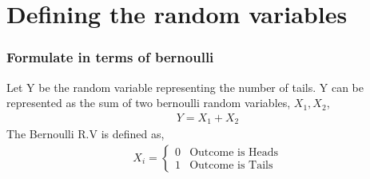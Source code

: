 \documentclass{beamer}
\providecommand{\brak}[1]{\ensuremath{\left(#1\right)}}
\theoremstyle{remark}
\providecommand{\norm}[1]{\lVert#1\rVert}
\let\vec\mathbf
\numberwithin{equation}{section}
\begin{document}
\section{Defining the random variables}
\begin{frame}
  \frametitle{Formulate in terms of bernoulli}
Let Y be the random variable representing the number of tails. Y can be represented as the sum of two bernoulli random variables, $X_1, X_2$,
\begin{align}
  Y = X_1 + X_2
\end{align}
The Bernoulli R.V is defined as,
\begin{align}
	X_i = \begin{cases}
		0 & \text{Outcome is Heads}\\	
		1 & \text{Outcome is Tails}	
	\end{cases}
\end{align}
\end{frame}
\end{document}
